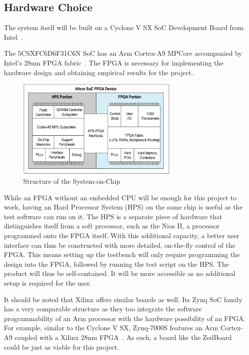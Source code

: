 \subsection{Hardware Choice}
The system itself will be built on a Cyclone V SX SoC Development Board from
Intel~\cite{Intel1}.

The 5CSXFC6D6F31C6N SoC has an Arm Cortex-A9 MPCore accompanied by Intel's 28nm
FPGA fabric~\cite{Altera1}.
The FPGA is necessary for implementing the hardware design and obtaining
empirical results for the project.

\begin{figure}[H]
  \centering
  \includegraphics[width=8cm]{img/SoCStructure}
  \caption{Structure of the System-on-Chip}
  \label{SoCStructure}
\end{figure}

While an FPGA without an embedded CPU will be enough for this project to work,
having an Hard Processor System (HPS) on the same chip is useful as the test
software can run on it.
The HPS is a separate piece of hardware that distinguishes itself from a soft
processor, such as the Nios II, a processor programmed onto the FPGA itself.
With this additional capacity, a better user interface can thus be constructed
with more detailed, on-the-fly control of the FPGA.
This means setting up the testbench will only require programming the design
into the FPGA, followed by running the test script on the HPS.
The product will thus be self-contained.
It will be more accessible as no additional setup is required for the user.

It should be noted that Xilinx offers similar boards as well.
Its Zynq SoC family has a very comparable structure as they too integrate the
software programmability of an Arm processor with the hardware possibility of
an FPGA.
For example, similar to the Cyclone V SX, Zynq-7000S features an Arm Cortex-A9
coupled with a Xilinx 28nm FPGA~\cite{Xilinx1}.
As such, a board like the ZedBoard~\cite{Xilinx2} could be just as viable for
this project.

